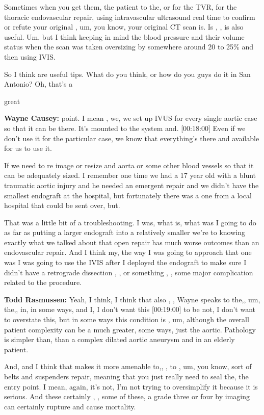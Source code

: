 \documentclass[
]{book}
\begin{document}
Sometimes when you get them, the patient to the, or for the TVR, for the
thoracic endovascular repair, using intravascular ultrasound real time
to confirm or refute your original , um, you know, your original CT scan
is. Is , , is also useful. Um, but I think keeping in mind the blood
pressure and their volume status when the scan was taken oversizing by
somewhere around 20 to 25\% and then using IVIS.

So I think are useful tips. What do you think, or how do you guys do it
in San Antonio? Oh, that's a

great

\textbf{Wayne Causey:} point. I mean , we, we set up IVUS for every single
aortic case so that it can be there. It's mounted to the system and.
{[}00:18:00{]} Even if we don't use it for the particular case, we know that
everything's there and available for us to use it.

If we need to re image or resize and aorta or some other blood vessels
so that it can be adequately sized. I remember one time we had a 17 year
old with a blunt traumatic aortic injury and he needed an emergent
repair and we didn't have the smallest endograft at the hospital, but
fortunately there was a one from a local hospital that could be sent
over, but.

That was a little bit of a troubleshooting. I was, what is, what was I
going to do as far as putting a larger endograft into a relatively
smaller we're to knowing exactly what we talked about that open repair
has much worse outcomes than an endovascular repair. And I think my, the
way I was going to approach that one was I was going to use the IVIS
after I deployed the endograft to make sure I didn't have a retrograde
dissection , , or something , , some major complication related to the
procedure.

\textbf{Todd Rasmussen:} Yeah, I think, I think that also , , Wayne speaks to
the,, um, the,, in, in some ways, and I, I don't want this {[}00:19:00{]} to
be not, I don't want to overstate this, but in some ways this condition
is , um, although the overall patient complexity can be a much greater,
some ways, just the aortic. Pathology is simpler than, than a complex
dilated aortic aneurysm and in an elderly patient.

And, and I think that makes it more amenable to,, , to , um, you know,
sort of belts and suspenders repair, meaning that you just really need
to seal the, the entry point. I mean, again, it's not, I'm not trying to
oversimplify it because it is serious. And these certainly , , some of
these, a grade three or four by imaging can certainly rupture and cause
mortality.
\end{document}
